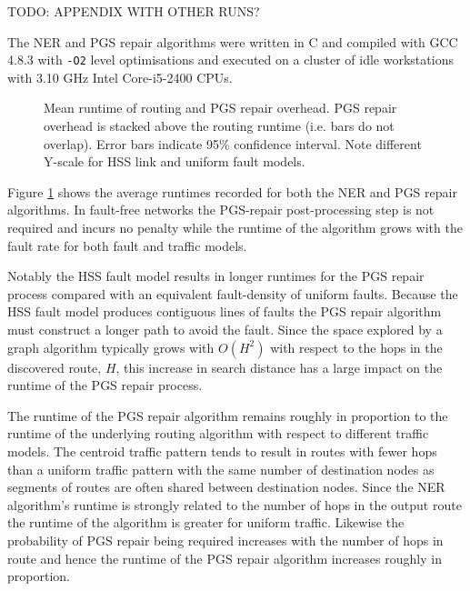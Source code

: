 			TODO: APPENDIX WITH OTHER RUNS?
			
			The NER and PGS repair algorithms were written in C and compiled with GCC
			4.8.3 with \verb|-O2| level optimisations and executed on a cluster of
			idle workstations with 3.10 GHz Intel Core-i5-2400 CPUs.
			
			\begin{figure}
				\center
				
				\caption{Mean runtime of routing and PGS repair overhead. PGS repair
				overhead is stacked above the routing runtime (i.e. bars do not
				overlap). Error bars indicate 95\% confidence interval. Note different
				Y-scale for HSS link and uniform fault models.}
				\label{fig:routing-runtimes}
			\end{figure}
			
			Figure \ref{fig:routing-runtimes} shows the average runtimes recorded for
			both the NER and PGS repair algorithms. In fault-free networks the
			PGS-repair post-processing step is not required and incurs no penalty
			while the runtime of the algorithm grows with the fault rate for both
			fault and traffic models.
			
			Notably the HSS fault model results in longer runtimes for the PGS repair
			process compared with an equivalent fault-density of uniform faults.
			Because the HSS fault model produces contiguous lines of faults the PGS
			repair algorithm must construct a longer path to avoid the fault.  Since
			the space explored by a graph algorithm typically grows with $O(H^2)$
			with respect to the hops in the discovered route, $H$, this increase in
			search distance has a large impact on the runtime of the PGS repair
			process.
			
			The runtime of the PGS repair algorithm remains roughly in proportion to
			the runtime of the underlying routing algorithm with respect to different
			traffic models. The centroid traffic pattern tends to result in routes
			with fewer hops than a uniform traffic pattern with the same number of
			destination nodes as segments of routes are often shared between
			destination nodes. Since the NER algorithm's runtime is strongly related
			to the number of hops in the output route the runtime of the algorithm is
			greater for uniform traffic. Likewise the probability of PGS repair being
			required increases with the number of hops in route and hence the runtime
			of the PGS repair algorithm increases roughly in proportion.
		
